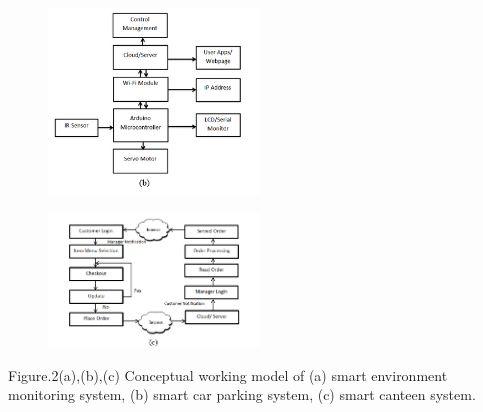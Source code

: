 \documentclass[conference]{IEEEtran}
\begin{document}
\begin{figure} 
    \centering
    \includegraphics[width=0.5\textwidth]{bibliography/images/b.png}
\end{figure}

\begin{figure}
    \centering
    \includegraphics[width=0.5\textwidth]{bibliography/images/c.png}
\end{figure}

Figure.2(a),(b),(c)
Conceptual working model of (a) smart environment monitoring system, (b) smart car parking system, (c) smart canteen system. 
\end{document}
